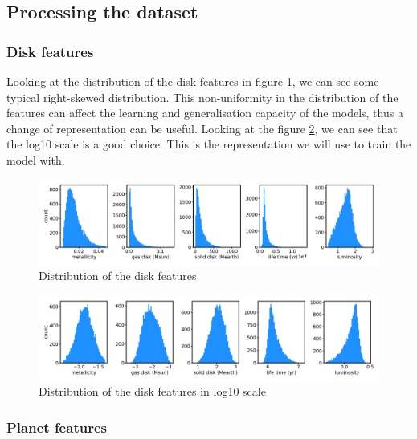 \documentclass[a4paper, 11pt]{article}
\begin{document}
    
    \subsection{Processing the dataset}
    
    \subsubsection{Disk features}
    Looking at the distribution of the disk features in figure \ref{fig:disk_feature_distribution}, we can see some typical right-skewed distribution. This non-uniformity in the distribution of the features can affect the learning and generalisation capacity of the models, thus a change of representation can be useful. Looking at the figure  \ref{fig:disk_feature_log_distribution}, we can see that the log10 scale is a good choice. This is the representation we will use to train the model with.
    
    \begin{figure}[H]                                           
    	\centering \includegraphics[width=1\textwidth]{images/disk_features_distribution.png}
    	\caption{Distribution of the disk features}
    	\label{fig:disk_feature_distribution}
    \end{figure}
    
    \begin{figure}[H]                                           
    	\centering \includegraphics[width=1\textwidth]{images/disk_features_log_distribution.png}
    	\caption{Distribution of the disk features in log10 scale}
    	\label{fig:disk_feature_log_distribution}
    \end{figure}
    
    \subsubsection{Planet features}
    
\end{document}
